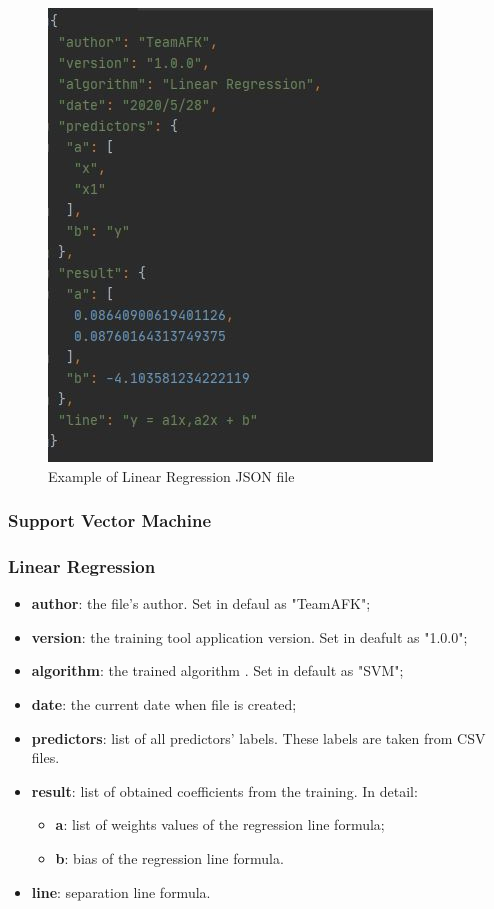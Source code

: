 		\begin{figure}[H]
		\centering
		\includegraphics[scale=0.70]{../Developer_manual/img/linear_regression_json.JPG}
		\caption{Example of Linear Regression JSON file}
	\end{figure}	
	
		\subsubsection{Support Vector Machine}
		\subsubsection{Linear Regression}
		\begin{itemize}
			\item\textbf{author}: the file's author. Set in defaul as "TeamAFK";
			\item\textbf{version}: the training tool application version. Set in deafult as "1.0.0";
			\item\textbf{algorithm}: the trained algorithm . Set in default as "SVM"; 	
			\item\textbf{date}: the current date when file is created;
			\item\textbf{predictors}: list of all predictors' labels. These labels are taken from CSV files.
			\item\textbf{result}: list of obtained coefficients from the training. In detail:
				\begin{itemize}
					\item\textbf{a}: list of weights values of the regression line formula;
					\item\textbf{b}: bias of the regression line formula. 
				\end{itemize}
			\item\textbf{line}: separation line formula.
					
		\end{itemize}
		
